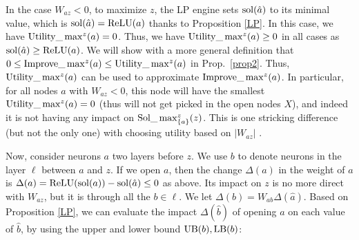 In the case $W_{az}<0$, to maximize $z$, the LP engine sets $\mathrm{sol}(\hat{a})$ to its minimal value, which is $\mathrm{sol}(\hat{a})=\mathrm{ReLU}(a)$ thanks to Proposition \ref{LP}. In this case, we have $\mathrm{Utility}\_\max^z(a)=0$.
Thus, we have $\mathrm{Utility}\_\max^z(a) \geq 0$ in all cases
as $\mathrm{sol}(\hat{a}) \geq \mathrm{ReLU}(a)$. 
We will show with a more general definition that $0 \leq \mathrm{Improve}\_\max^z(a) \leq \mathrm{Utility}\_\max^z(a)$ in Prop.~\ref{prop2}. Thus, $\mathrm{Utility}\_\max^z(a)$ can be used to approximate $\mathrm{Improve}\_\max^z(a)$. In particular, for all nodes $a$ with $W_{az}< 0$,
this node will have the smallest $\mathrm{Utility}\_\max\nolimits^z(a)=0$ (thus will not get picked in the open nodes $X$), and indeed it is not having any impact on  $\mathrm{Sol}\_\max_{\{a\}}^z(z)$. This is one stricking difference (but not the only one) with choosing utility based on 
$|W_{az}|$ \cite{DivideAndSlide}.

	
%	
	
% 			

\medskip

Now, consider neurons $a$ two layers before $z$. We use $b$ to denote neurons in the layer $\ell$ between $a$ and $z$. 
If we open $a$, then the change $\Delta(a)$ in the weight of $a$ is 
$\Delta(a)=\mathrm{ReLU}(\mathrm{sol}(a)) - \mathrm{sol}(\hat{a}) \leq 0$ as above. Its impact on $z$ is no more direct with $W_{az}$, but it is through all the $b \in \ell$. 
We let $\Delta(b) = W_{ab}\Delta(\hat{a})$.
Based on Proposition \ref{LP}, we can evaluate the impact 
$\Delta(\hat{b})$ of opening $a$ on each value of $\hat{b}$, by using the upper and lower bound $\mathrm{UB}(b),\mathrm{LB}(b)$:

